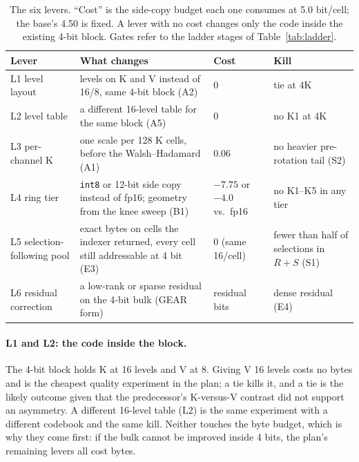 \documentclass[10pt,twocolumn]{article}
\begin{document}
\begin{table}[t]
\centering
\footnotesize
\caption{The six levers. ``Cost'' is the side-copy budget each one consumes at 5.0 bit/cell; the base's 4.50 is fixed. A lever with no cost changes only the code inside the existing 4-bit block. Gates refer to the ladder stages of Table~\ref{tab:ladder}.}
\label{tab:levers}
\begin{tabularx}{\textwidth}{@{}l>{\raggedright\arraybackslash}Xll@{}}
\toprule
Lever & What changes & Cost & Kill \\
\midrule
L1 level layout & 16 levels on K and V instead of 16/8, same 4-bit block (A2) & 0 & tie at 4K \\
L2 level table & a different 16-level table for the same block (A5) & 0 & no K1 at 4K \\
L3 per-channel K & one scale per 128 K cells, before the Walsh--Hadamard (A1) & 0.06 & no heavier pre-rotation tail (S2) \\
L4 ring tier & \texttt{int8} or 12-bit side copy instead of fp16; geometry from the knee sweep (B1) & $-7.75$ or $-4.0$ vs.\ fp16 & no K1--K5 in any tier \\
L5 selection-following pool & exact bytes on cells the indexer returned, every cell still addressable at 4 bit (E3) & 0 (same 16/cell) & fewer than half of selections in $R{+}S$ (S1) \\
L6 residual correction & a low-rank or sparse residual on the 4-bit bulk (GEAR form) & residual bits & dense residual (E4) \\
\bottomrule
\end{tabularx}
\end{table}

\paragraph{L1 and L2: the code inside the block.} The 4-bit block holds K at 16 levels and V at 8. Giving V 16 levels costs no bytes and is the cheapest quality experiment in the plan; a tie kills it, and a tie is the likely outcome given that the predecessor's K-versus-V contrast did not support an asymmetry. A different 16-level table (L2) is the same experiment with a different codebook and the same kill. Neither touches the byte budget, which is why they come first: if the bulk cannot be improved inside 4 bits, the plan's remaining levers all cost bytes.
\end{document}
